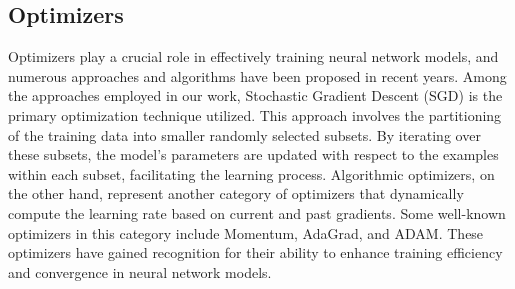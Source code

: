 \subsection{Optimizers}

Optimizers play a crucial role in effectively training neural network models, and numerous approaches and algorithms have been proposed in recent years. Among the approaches employed in our work, Stochastic Gradient Descent (SGD) is the primary optimization technique utilized. This approach involves the partitioning of the training data into smaller randomly selected subsets. By iterating over these subsets, the model's parameters are updated with respect to the examples within each subset, facilitating the learning process.
Algorithmic optimizers, on the other hand, represent another category of optimizers that dynamically compute the learning rate based on current and past gradients. Some well-known optimizers in this category include Momentum, AdaGrad, and ADAM. These optimizers have gained recognition for their ability to enhance training efficiency and convergence in neural network models.
